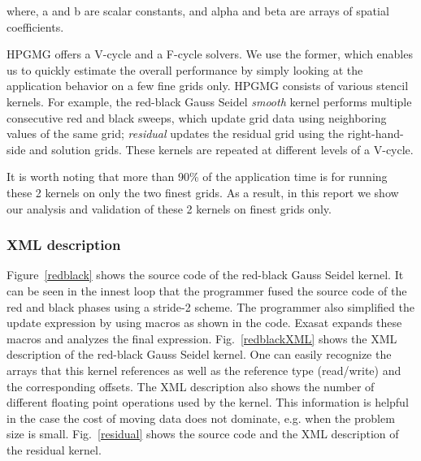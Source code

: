 \documentclass{article}
\begin{document}
where, a and b are scalar constants, and alpha and beta are arrays of spatial coefficients.

HPGMG offers a V-cycle and a F-cycle solvers.
We use the former, which enables us to quickly estimate the overall performance by simply looking at the application behavior on a few fine grids only.
HPGMG consists of various stencil kernels.
For example, the red-black Gauss Seidel {\em smooth} kernel performs multiple consecutive red and black sweeps, which update grid data using neighboring values of the same grid; 
{\em residual} updates the residual grid using the right-hand-side and solution grids. 
These kernels are repeated at different levels of a V-cycle.

It is worth noting that more than 90\% of the application time is for running these 2 kernels on only the two finest grids.
As a result, in this report we show our analysis and validation of these 2 kernels on finest grids only. 


\subsubsection{XML description}
Figure~\ref{redblack} shows the source code of the red-black Gauss Seidel kernel.
It can be seen in the innest loop that the programmer fused the source code of the red and black phases using a stride-2 scheme. 
The programmer also simplified the update expression by using macros as shown in the code.
Exasat expands these macros and analyzes the final expression.
Fig.~\ref{redblackXML} shows the XML description of the red-black Gauss Seidel kernel.
One can easily recognize the arrays that this kernel references as well as the reference type (read/write) and the corresponding offsets.
The XML description also shows the number of different floating point operations used by the kernel.
This information is helpful in the case the cost of moving data does not dominate, e.g. when the problem size is small. 
Fig.~\ref{residual} shows the source code and the XML description of the residual kernel.
\end{document}
